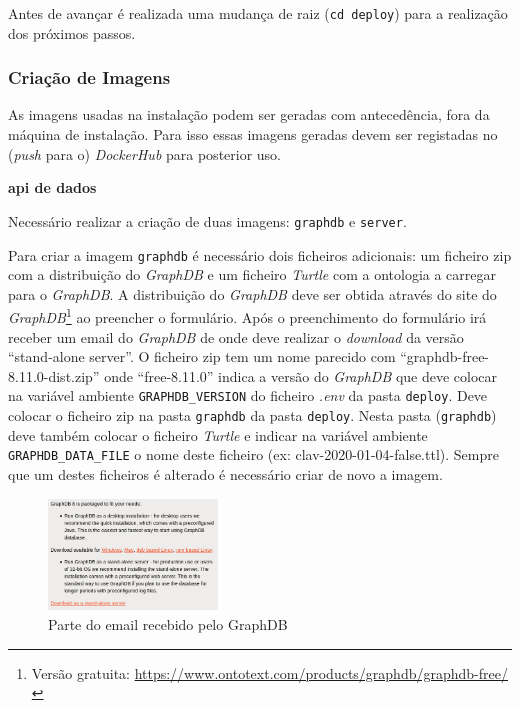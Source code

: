 Antes de avançar é realizada uma mudança de raiz (\verb|cd deploy|) para a realização dos próximos passos.

\subsubsection{Criação de Imagens}\label{sec:int-imagens}

As imagens usadas na instalação podem ser geradas com antecedência, fora da máquina de instalação. Para isso essas imagens geradas devem ser registadas no (\textit{push} para o) \textit{DockerHub} para posterior uso.

\begin{description}
    \item \textbf{\acrshort{api} de dados}

    Necessário realizar a criação de duas imagens: \texttt{graphdb} e \texttt{server}.

    Para criar a imagem \texttt{graphdb} é necessário dois ficheiros adicionais: um ficheiro zip com a distribuição do \textit{GraphDB} e um ficheiro \textit{Turtle} com a ontologia a carregar para o \textit{GraphDB}. A distribuição do \textit{GraphDB} deve ser obtida através do site do \textit{GraphDB}\footnote{Versão gratuita: \url{https://www.ontotext.com/products/graphdb/graphdb-free/}} ao preencher o formulário. Após o preenchimento do formulário irá receber um email do \textit{GraphDB} de onde deve realizar o \textit{download} da versão ``stand-alone server''. O ficheiro zip tem um nome parecido com ``graphdb-free-8.11.0-dist.zip'' onde ``free-8.11.0'' indica a versão do \textit{GraphDB} que deve colocar na variável ambiente \texttt{GRAPHDB\_VERSION} do ficheiro \textit{.env} da pasta \texttt{deploy}. Deve colocar o ficheiro zip na pasta \texttt{graphdb} da pasta \texttt{deploy}. Nesta pasta (\texttt{graphdb}) deve também colocar o ficheiro \textit{Turtle} e indicar na variável ambiente \texttt{GRAPHDB\_DATA\_FILE} o nome deste ficheiro (ex: clav-2020-01-04-false.ttl). Sempre que um destes ficheiros é alterado é necessário criar de novo a imagem.

    \begin{figure}[H]
        \centering
        \includegraphics[width=0.4\textwidth]{img/graphdb_email.png}
        \caption{Parte do email recebido pelo GraphDB\label{fig:instalacao-email}}
    \end{figure}


\end{description}
